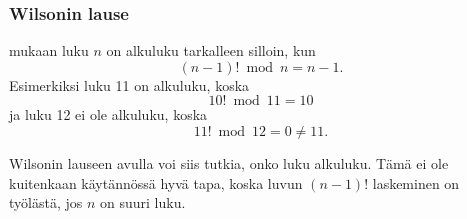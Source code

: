 \subsubsection{Wilsonin lause}


 mukaan luku $n$ on alkuluku
tarkalleen silloin, kun
\[(n-1)! \bmod n = n-1.\]
Esimerkiksi luku 11 on alkuluku, koska
\[10! \bmod 11 = 10\]
ja luku 12 ei ole alkuluku, koska
\[11! \bmod 12 = 0 \neq 11.\]

Wilsonin lauseen avulla voi siis tutkia, onko luku alkuluku.
Tämä ei ole kuitenkaan käytännössä hyvä tapa,
koska luvun $(n-1)!$ laskeminen on työlästä,
jos $n$ on suuri luku.


